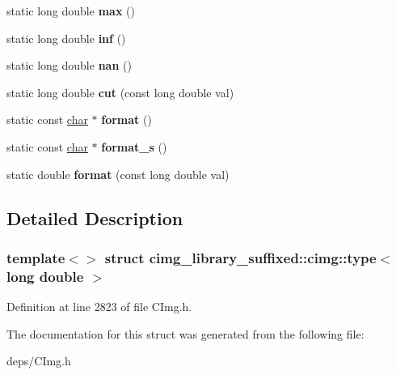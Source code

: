 \begin{DoxyCompactItemize}
static long double {\bfseries max} ()
\item 
\mbox{\label{structcimg__library__suffixed_1_1cimg_1_1type_3_01long_01double_01_4_a4e46f5dc1b42e64e927d05926a95fef2}} 
static long double {\bfseries inf} ()
\item 
\mbox{\label{structcimg__library__suffixed_1_1cimg_1_1type_3_01long_01double_01_4_a534ad4ae798d7dd30333fb9a045344b3}} 
static long double {\bfseries nan} ()
\item 
\mbox{\label{structcimg__library__suffixed_1_1cimg_1_1type_3_01long_01double_01_4_aa734042879fd2ee7cf1a195addaecae8}} 
static long double {\bfseries cut} (const long double val)
\item 
\mbox{\label{structcimg__library__suffixed_1_1cimg_1_1type_3_01long_01double_01_4_a7863f728ef96817bf30ea3fbbd7289c2}} 
static const \hyperlink{classchar}{char} $\ast$ {\bfseries format} ()
\item 
\mbox{\label{structcimg__library__suffixed_1_1cimg_1_1type_3_01long_01double_01_4_a221ce594c8ddc51dedd3367010a3c08d}} 
static const \hyperlink{classchar}{char} $\ast$ {\bfseries format\+\_\+s} ()
\item 
\mbox{\label{structcimg__library__suffixed_1_1cimg_1_1type_3_01long_01double_01_4_a89d8c31aa610f90c6cb16409d32954c1}} 
static double {\bfseries format} (const long double val)
\end{DoxyCompactItemize}


\subsection{Detailed Description}
\subsubsection*{template$<$$>$\newline
struct cimg\+\_\+library\+\_\+suffixed\+::cimg\+::type$<$ long double $>$}



Definition at line 2823 of file C\+Img.\+h.



The documentation for this struct was generated from the following file\+:\begin{DoxyCompactItemize}
\item 
deps/C\+Img.\+h\end{DoxyCompactItemize}
